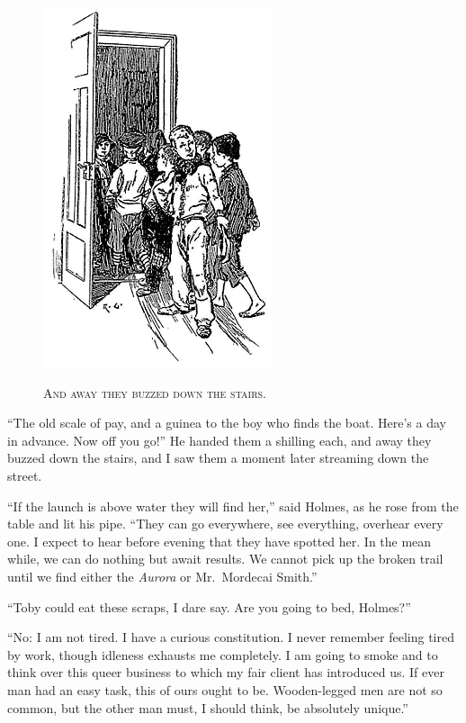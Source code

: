 \documentclass[12pt,english,oneside]{book}
\newcommand{\noun}[1]{\textsc{#1}}
\begin{document}
%
\begin{figure}[htbp]
\noindent \begin{center}\includegraphics{images/sign410-sign-13.png}\end{center}

\noindent \begin{center}\noun{And away they buzzed down the stairs.}\end{center}
\end{figure}
{}``The old scale of pay, and a guinea to the boy who finds the boat.
Here's a day in advance. Now off you go!'' He handed them a shilling
each, and away they buzzed down the stairs, and I saw them a moment
later streaming down the street.

{}``If the launch is above water they will find her,'' said Holmes,
as he rose from the table and lit his pipe. {}``They can go everywhere,
see everything, overhear every one. I expect to hear before evening
that they have spotted her. In the mean while, we can do nothing but
await results. We cannot pick up the broken trail until we find either
the \emph{Aurora} or Mr.\ Mordecai Smith.''

{}``Toby could eat these scraps, I dare say. Are you going to bed,
Holmes?''

{}``No: I am not tired. I have a curious constitution. I never remember
feeling tired by work, though idleness exhausts me completely. I am
going to smoke and to think over this queer business to which my fair
client has introduced us. If ever man had an easy task, this of ours
ought to be. Wooden-legged men are not so common, but the other man
must, I should think, be absolutely unique.''
\end{document}
